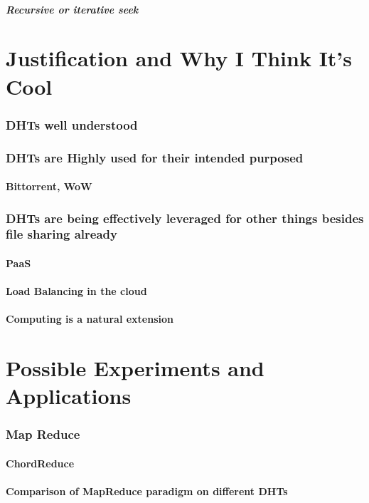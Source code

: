 \documentclass[10pt,letterpaper]{report}
\begin{document}
\paragraph{Recursive or iterative seek}


\chapter{Justification and Why I Think It's Cool}
\subsection{DHTs well understood}
\subsection{DHTs are Highly used for their intended purposed}
\subsubsection{Bittorrent, WoW}
\subsection{DHTs are being effectively leveraged for other things besides file sharing already}
\subsubsection{PaaS}
\subsubsection{Load Balancing in the cloud}
\subsubsection{Computing is a natural extension}

\chapter{Possible Experiments and Applications}

\subsection{Map Reduce}
\subsubsection{ChordReduce}
\subsubsection{Comparison of  MapReduce paradigm on different DHTs}
\end{document}
